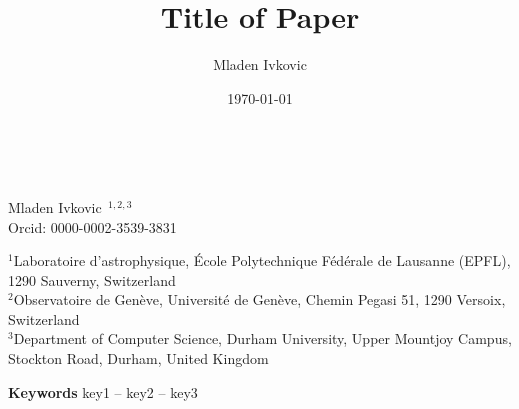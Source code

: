 




\title{Title of Paper}
\author{Mladen Ivkovic}
\date{\today}








\nocite{*} %



\onecolumn



\begin{center}
\begin{Huge}
	\textbf{\MyTitle}\\
\end{Huge}
\end{center}

\vspace{.5cm}

\begin{Large}
Mladen Ivkovic $^{\,1,2,3}$ \\
Orcid: 0000-0002-3539-3831 \\
\end{Large}

$^{1}$Laboratoire d'astrophysique, \'{E}cole Polytechnique F\'{e}d\'{e}rale de Lausanne (EPFL), 1290
Sauverny, Switzerland\\
$^{2}$Observatoire de Gen\`{e}ve, Universit\'{e} de Gen\`{e}ve, Chemin Pegasi 51, 1290 Versoix,
Switzerland\\
$^{3}$Department of Computer Science, Durham University, Upper Mountjoy Campus, Stockton Road,  Durham,
United Kingdom\\

\vspace{.5cm}



\vspace{.5cm}

\textbf{Keywords} key1 -- key2 -- key3

